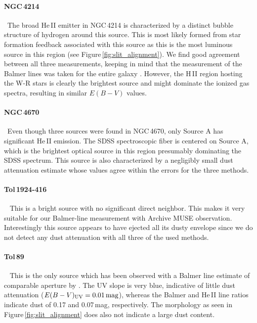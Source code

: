 \documentclass[]{aastex63}
\begin{document}
\paragraph{NGC\,4214~}~The broad He\,II emitter in NGC\,4214 is characterized by a distinct bubble structure of hydrogen around this source. This is most likely formed from star formation feedback associated with this source as this is the most luminous source in this region (see Figure\,\ref{fig:slit_alignment}).
We find good agreement between all three measurements, keeping in mind that the measurement of the Balmer lines was taken for the entire galaxy \citep{moustakas_integrated_2006}. However, the H\,II region hosting the W-R stars is clearly the brightest source and might dominate the ionized gas spectra, resulting in similar $E(B-V)$ values.

\paragraph{NGC\,4670~}~Even though three sources were found in NGC\,4670, only Source A has significant He\,II emission. The SDSS spectroscopic fiber is centered on Source A, which is the brightest optical source in this region presumably dominating the SDSS spectrum. This source is also characterized by a negligibly small dust attenuation estimate whose values agree within the errors for the three methods. 

\paragraph{Tol\,1924-416~}~
This is a bright source with no significant direct neighbor. This makes it very suitable for our Balmer-line measurement with Archive MUSE observation. Interestingly this source appears to have ejected all its dusty envelope since we do not detect any dust attenuation with all three of the used methods.

\paragraph{Tol\,89~}~
This is the only source which has been observed with a Balmer line estimate of comparable aperture by \citet{sidoli_massive_2006}. 
The UV slope is very blue, indicative of little dust attenuation ($E(B-V){\rm _{UV} = 0.01\,mag}$), whereas the Balmer and He\,II line ratios indicate dust of 0.17 and 0.07\,mag, respectively. The morphology as seen in Figure\,\ref{fig:slit_alignment} does also not indicate a large dust content.
\end{document}
